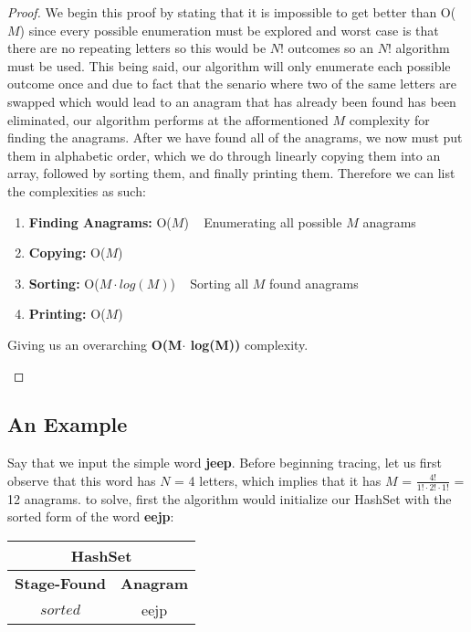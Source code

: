 \documentclass[12pt]{article}
\begin{document}
\begin{proof}
We begin this proof by stating that it is impossible to get better than O($M$) since every possible enumeration
must be explored and worst case is that there are no repeating letters so this would be $N$! outcomes so an $N$!
algorithm must be used. This being said, our algorithm will only enumerate each possible outcome once and due
to fact that the senario where two of the same letters are swapped which would lead to an anagram that has already been
found has been eliminated, our algorithm performs at the afformentioned $M$ complexity for finding the anagrams. After
we have found all of the anagrams, we now must put them in alphabetic order, which we do through linearly
copying them into an array, followed by sorting them, and finally printing them. Therefore we can list the
complexities as such:
\begin{enumerate}
    \item \textbf{Finding Anagrams:} O($M$) ~ Enumerating all possible $M$ anagrams
    \item \textbf{Copying:} O($M$)
    \item \textbf{Sorting:} O($M\cdot log(M)$) ~ Sorting all $M$ found anagrams
    \item \textbf{Printing:} O($M$)
\end{enumerate}

\begin{center}
    Giving us an overarching \textbf{O(M$\cdot$ log(M))} complexity.
\end{center}

\end{proof}





\subsection{An Example}
Say that we input the simple word \textbf{jeep}. Before beginning tracing, let us first observe that this word has
$N$ = 4 letters, which implies that it has $M$ = $\frac{4!}{1!\cdot 2!\cdot 1!}$ = 12 anagrams. to solve, first the
algorithm would initialize our HashSet with the sorted form of the word \textbf{eejp}:

\begin{center}
\begin{tabular}{ |c|c| }
    \hline
    \multicolumn{2}{|c|}{HashSet} \\
    \hline
    \textbf{Stage-Found} & \textbf{Anagram} \\
    \hline
    $sorted$ & eejp \\
    \hline
\end{tabular}
\end{center}
\end{document}
